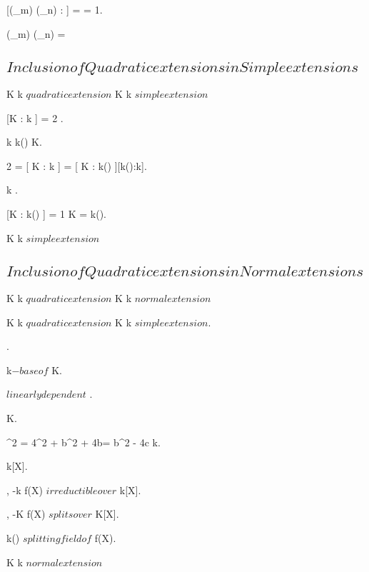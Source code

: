 \documentclass[a5paper]{book}
\begin{document}
{{{			[\Q(\zeta_m) \cap \Q(\zeta_n) : \Q ] =  = 1.

			\Q(\zeta_m) \cap \Q(\zeta_n) = \Q 
		}
	}
	\newpage


	\subsection{ $ Inclusion of Quadratic extensions in Simple extensions $ }
	
	{
		K \extends k $ quadratic extension $
	}
	\proposition
	{
		K \extends k $ simple extension $
	}
	\demonstration
	{
		[K : k ] = 2 \imp {}.

		k \subset k(\theta) \subset K.

		2 = [ K : k ] = [ K : k(\theta) ][k(\theta):k].

		\theta \nin k \imp [k(\theta):k] .

		[K : k(\theta) ] = 1 \imp K = k(\theta).

		K \extends k $ simple extension $
	}
	\newpage


	\subsection{ $ Inclusion of Quadratic extensions in Normal extensions $ }
	
	{
		K \extends k $ quadratic extension $
	}
	\proposition
	{
		K \extends k $ normal extension $
	}
	\demonstration
	{
		K \extends k $ quadratic extension $ \imp K \extends k $ simple extension $.

		.

		 k$-base of $ K.

		 $ linearly dependent $ \imp {}.

		 \in K.

		\eta^2 = 4\eta^2 + b^2 + 4b\eta = b^2 - 4c \in k.

		 \in k[X].

		\eta, -\eta \nin k \imp f(X) $ irreductible over $ k[X].

		\eta, -\eta \in K \imp f(X) $ splits over $ K[X].

		k(\theta) $ splitting field of $ f(X).

		K \extends k $ normal extension $




	}
	\newpage

}
\end{document}
